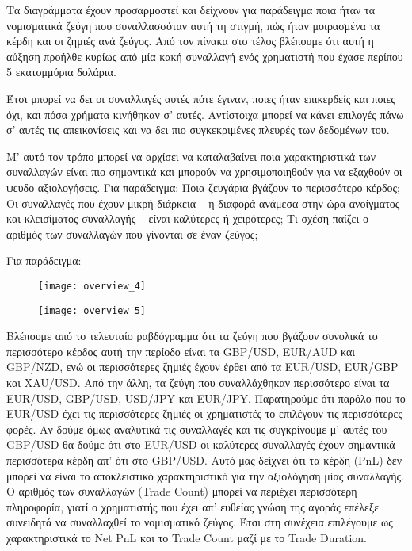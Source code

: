 Τα διαγράμματα έχουν προσαρμοστεί και δείχνουν για παράδειγμα ποια ήταν τα νομισματικά ζεύγη που συναλλασσόταν αυτή τη στιγμή, πώς ήταν μοιρασμένα τα κέρδη και οι ζημιές ανά ζεύγος. Από τον πίνακα στο τέλος βλέπουμε ότι αυτή η αύξηση προήλθε κυρίως από μία κακή συναλλαγή ενός χρηματιστή που έχασε περίπου 5 εκατομμύρια δολάρια.

Έτσι μπορεί να δει οι συναλλαγές αυτές πότε έγιναν, ποιες ήταν επικερδείς και ποιες όχι, και πόσα χρήματα κινήθηκαν σ’ αυτές. Αντίστοιχα μπορεί να κάνει επιλογές πάνω σ’ αυτές τις απεικονίσεις και να δει πιο συγκεκριμένες πλευρές των δεδομένων του. 

Μ’ αυτό τον τρόπο μπορεί να αρχίσει να καταλαβαίνει ποια χαρακτηριστικά των συναλλαγών είναι πιο σημαντικά και μπορούν να χρησιμοποιηθούν για να εξαχθούν οι ψευδο-αξιολογήσεις. Για παράδειγμα: Ποια ζευγάρια βγάζουν το περισσότερο κέρδος; Oι συναλλαγές που έχουν μικρή διάρκεια – η διαφορά ανάμεσα στην ώρα ανοίγματος και κλεισίματος συναλλαγής – είναι καλύτερες ή χειρότερες; Τι σχέση παίζει ο αριθμός των συναλλαγών που γίνονται σε έναν ζεύγος;

Για παράδειγμα:

\begin{figure}[H]
	\centering
	\begin{minipage}{0.3\textwidth}
		\centering
		\texttt{[image: overview\_4]}
		\label{fig:overview_4}	
	\end{minipage}
	\hfill
	\begin{minipage}{0.7\textwidth}
		\centering
		\texttt{[image: overview\_5]}
		\label{fig:overview_5}	
	\end{minipage}
\end{figure}

Βλέπουμε από το τελευταίο ραβδόγραμμα ότι τα ζεύγη που βγάζουν συνολικά το περισσότερο κέρδος αυτή την περίοδο είναι τα GBP/USD, EUR/AUD και GBP/NZD, ενώ οι περισσότερες ζημιές έχουν έρθει από τα EUR/USD, EUR/GBP και XAU/USD. Από την άλλη, τα ζεύγη που συναλλάχθηκαν περισσότερο είναι τα EUR/USD, GBP/USD, USD/JPY και EUR/JPY. Παρατηρούμε ότι παρόλο που το EUR/USD έχει τις περισσότερες ζημιές οι χρηματιστές το επιλέγουν τις περισσότερες φορές. Αν δούμε όμως αναλυτικά τις συναλλαγές και τις συγκρίνουμε μ’ αυτές του GBP/USD θα δούμε ότι στο EUR/USD οι καλύτερες συναλλαγές έχουν σημαντικά περισσότερα κέρδη απ’ ότι στο GBP/USD. Αυτό μας δείχνει ότι τα κέρδη (PnL) δεν μπορεί να είναι το αποκλειστικό χαρακτηριστικό για την αξιολόγηση μίας συναλλαγής. Ο αριθμός των συναλλαγών (Trade Count) μπορεί να περιέχει περισσότερη πληροφορία, γιατί ο χρηματιστής που έχει απ’ ευθείας γνώση της αγοράς επέλεξε συνειδητά να συναλλαχθεί το νομισματικό ζεύγος. Έτσι στη συνέχεια επιλέγουμε ως χαρακτηριστικά το Net PnL και το Trade Count μαζί με το Trade Duration.

